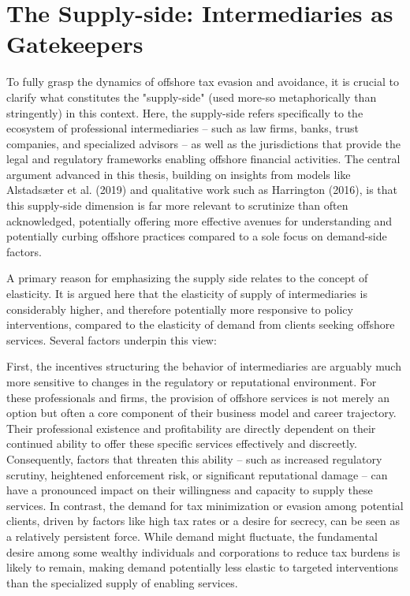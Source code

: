 \section{The Supply-side: Intermediaries as Gatekeepers}
\label{sec:1_3}

To fully grasp the dynamics of offshore tax evasion and avoidance, it is crucial to clarify what constitutes the "supply-side" (used more-so metaphorically than stringently) in this context. Here, the supply-side refers specifically to the ecosystem of professional intermediaries – such as law firms, banks, trust companies, and specialized advisors – as well as the jurisdictions that provide the legal and regulatory frameworks enabling offshore financial activities. The central argument advanced in this thesis, building on insights from models like Alstadsæter et al. (2019) and qualitative work such as Harrington (2016), is that this supply-side dimension is far more relevant to scrutinize than often acknowledged, potentially offering more effective avenues for understanding and potentially curbing offshore practices compared to a sole focus on demand-side factors.

A primary reason for emphasizing the supply side relates to the concept of elasticity. It is argued here that the elasticity of supply of intermediaries is considerably higher, and therefore potentially more responsive to policy interventions, compared to the elasticity of demand from clients seeking offshore services. Several factors underpin this view:

First, the incentives structuring the behavior of intermediaries are arguably much more sensitive to changes in the regulatory or reputational environment. For these professionals and firms, the provision of offshore services is not merely an option but often a core component of their business model and career trajectory. Their professional existence and profitability are directly dependent on their continued ability to offer these specific services effectively and discreetly. Consequently, factors that threaten this ability – such as increased regulatory scrutiny, heightened enforcement risk, or significant reputational damage – can have a pronounced impact on their willingness and capacity to supply these services. In contrast, the demand for tax minimization or evasion among potential clients, driven by factors like high tax rates or a desire for secrecy, can be seen as a relatively persistent force. While demand might fluctuate, the fundamental desire among some wealthy individuals and corporations to reduce tax burdens is likely to remain, making demand potentially less elastic to targeted interventions than the specialized supply of enabling services.

